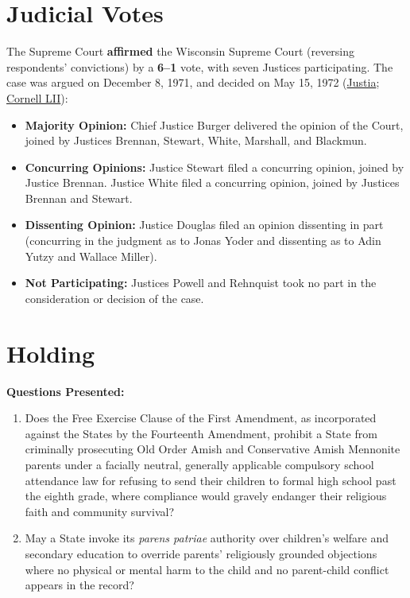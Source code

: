 \documentclass[12pt]{article}
\begin{document}
\section{Judicial Votes}
The Supreme Court \textbf{affirmed} the Wisconsin Supreme Court (reversing respondents' convictions) by a \textbf{6--1} vote, with seven Justices participating. The case was argued on December 8, 1971, and decided on May 15, 1972 (\href{https://supreme.justia.com/cases/federal/us/406/205/}{Justia}; \href{https://www.law.cornell.edu/supremecourt/text/406/205}{Cornell LII}):

\begin{itemize}
    \item \textbf{Majority Opinion:} Chief Justice Burger delivered the opinion of the Court, joined by Justices Brennan, Stewart, White, Marshall, and Blackmun.
    \item \textbf{Concurring Opinions:} Justice Stewart filed a concurring opinion, joined by Justice Brennan. Justice White filed a concurring opinion, joined by Justices Brennan and Stewart.
    \item \textbf{Dissenting Opinion:} Justice Douglas filed an opinion dissenting in part (concurring in the judgment as to Jonas Yoder and dissenting as to Adin Yutzy and Wallace Miller).
    \item \textbf{Not Participating:} Justices Powell and Rehnquist took no part in the consideration or decision of the case.
\end{itemize}

\section{Holding}
\textbf{Questions Presented:}

\begin{enumerate}
  \item Does the Free Exercise Clause of the First Amendment, as incorporated against the States by the Fourteenth Amendment, prohibit a State from criminally prosecuting Old Order Amish and Conservative Amish Mennonite parents under a facially neutral, generally applicable compulsory school attendance law for refusing to send their children to formal high school past the eighth grade, where compliance would gravely endanger their religious faith and community survival?
  \item May a State invoke its \emph{parens patriae} authority over children's welfare and secondary education to override parents' religiously grounded objections where no physical or mental harm to the child and no parent-child conflict appears in the record?
\end{enumerate}
\end{document}
